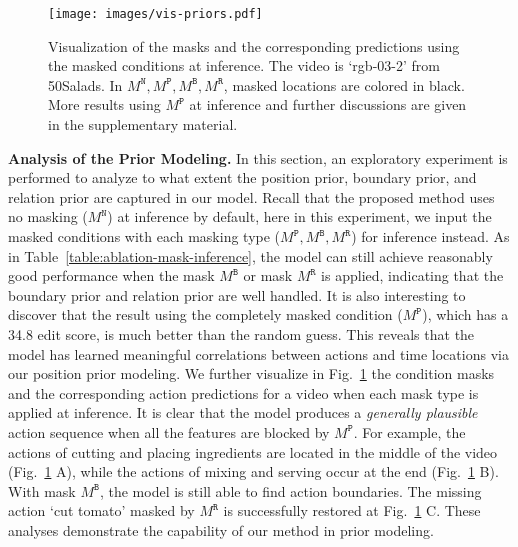 \documentclass[10pt,twocolumn,letterpaper]{article}
\begin{document}
\begin{figure}[t]
\begin{center}
   \texttt{[image: images/vis-priors.pdf]}
\end{center}
   \caption{Visualization of the masks and the corresponding predictions using the masked conditions at inference. The video is `rgb-03-2' from 50Salads. In $M^\mathtt{N}, M^\mathtt{P}, M^\mathtt{B}, M^\mathtt{R}$, masked locations are colored in black. More results using $M^\mathtt{P}$ at inference and further discussions are given in the supplementary material.}
\label{fig:vis-priors}
\end{figure}


\textbf{Analysis of the Prior Modeling.}
In this section, an exploratory experiment is performed to analyze to what extent the position
prior, boundary prior, and relation prior are captured in our model.
Recall that the proposed method uses no masking ($M^\mathtt{N}$) at inference by default, here in this experiment, we input the masked conditions with each masking type ($M^\mathtt{P}, M^\mathtt{B}, M^\mathtt{R}$) for inference instead.
As in Table~\ref{table:ablation-mask-inference}, the model can still achieve reasonably good performance when the mask $M^\mathtt{B}$ or mask $M^\mathtt{R}$ is applied, indicating that the boundary prior and relation prior are well handled.
It is also interesting to discover that the result using the completely masked condition ($M^\mathtt{P}$), which has a 34.8 edit score, is much better than the random guess.
This reveals that the model has learned meaningful correlations between actions and time locations via our position prior modeling.
We further visualize in Fig.~\ref{fig:vis-priors} the condition masks and the corresponding action predictions for a video when each mask type is applied at inference. 
It is clear that the model produces a \textit{generally plausible} action sequence when all the features are blocked by $M^\mathtt{P}$.
For example, the actions of cutting and placing ingredients are located in the middle of the video (Fig.~\ref{fig:vis-priors} A), while the actions of mixing and serving occur at the end (Fig.~\ref{fig:vis-priors} B).
With mask $M^\mathtt{B}$, the model is still able to find action boundaries.
The missing action `cut tomato' masked by $M^\mathtt{R}$ is successfully restored at Fig.~\ref{fig:vis-priors} C.
These analyses demonstrate the capability of our method in prior modeling.
\end{document}
